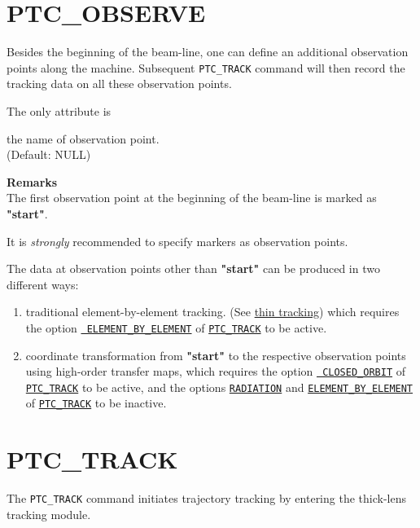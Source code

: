 \section{PTC\_OBSERVE} 
\label{sec:ptc_observe}

Besides the beginning of the beam-line, one can define an additional
observation points along the machine. Subsequent \texttt{PTC\_TRACK}
command will then record the tracking data on all these observation
points.  


The only attribute is 
\begin{madlist}
   the name of observation point.  \\ (Default: NULL)
\end{madlist}


{\bf Remarks}\\

The first observation point at the beginning of the beam-line is marked
as {\bf "start"}.  
       
It is {\em strongly} recommended to specify markers as observation points.

The data at observation points other than {\bf "start"} can be produced
in two different ways:
\begin{enumerate}
  \item traditional element-by-element tracking. (See
    \hyperref[chap:thintrack]{\madx thin tracking}) which 
    requires the option \hyperref[opt:element_by_element]{\tt
      ELEMENT\_BY\_ELEMENT} of \hyperref[sec:ptc_track]{\tt PTC\_TRACK} to
    be active.

  \item coordinate transformation from {\bf "start"} to the
  respective observation points using high-order \ptc transfer
  maps, which requires the option \hyperref[opt:closed_orbit]{\tt
    CLOSED\_ORBIT} of \hyperref[sec:ptc_track]{\tt PTC\_TRACK} to be
  active, and the options \hyperref[opt:radiation]{\tt RADIATION}
  and \hyperref[opt:element_by_element]{\tt ELEMENT\_BY\_ELEMENT} of
  \hyperref[sec:ptc_track]{\tt PTC\_TRACK} to be inactive.
\end{enumerate} 


\section{PTC\_TRACK}
\label{sec:ptc_track}

The {\tt PTC\_TRACK} command initiates trajectory tracking by
entering the thick-lens tracking module.  

